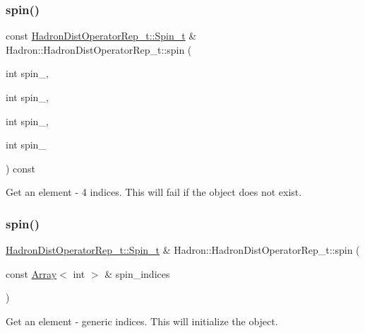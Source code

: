 \subsubsection{\texorpdfstring{spin()}{spin()}\hspace{0.1cm}{\footnotesize\ttfamily [6/8]}}
{\footnotesize\ttfamily const \mbox{\hyperlink{structHadron_1_1HadronDistOperatorRep__t_1_1Spin__t}{Hadron\+Dist\+Operator\+Rep\+\_\+t\+::\+Spin\+\_\+t}} \& Hadron\+::\+Hadron\+Dist\+Operator\+Rep\+\_\+t\+::spin (\begin{DoxyParamCaption}\item[{int}]{spin\+\_,  }\item[{int}]{spin\+\_,  }\item[{int}]{spin\+\_,  }\item[{int}]{spin\+\_ }\end{DoxyParamCaption}) const}



Get an element -\/ 4 indices. This will fail if the object does not exist. 

\mbox{\label{classHadron_1_1HadronDistOperatorRep__t_ad889e6377702e72419f259860142225f}} 
\subsubsection{\texorpdfstring{spin()}{spin()}\hspace{0.1cm}{\footnotesize\ttfamily [7/8]}}
{\footnotesize\ttfamily \mbox{\hyperlink{structHadron_1_1HadronDistOperatorRep__t_1_1Spin__t}{Hadron\+Dist\+Operator\+Rep\+\_\+t\+::\+Spin\+\_\+t}} \& Hadron\+::\+Hadron\+Dist\+Operator\+Rep\+\_\+t\+::spin (\begin{DoxyParamCaption}\item[{const \mbox{\hyperlink{classXMLArray_1_1Array}{Array}}$<$ int $>$ \&}]{spin\+\_\+indices }\end{DoxyParamCaption})}



Get an element -\/ generic indices. This will initialize the object. 

